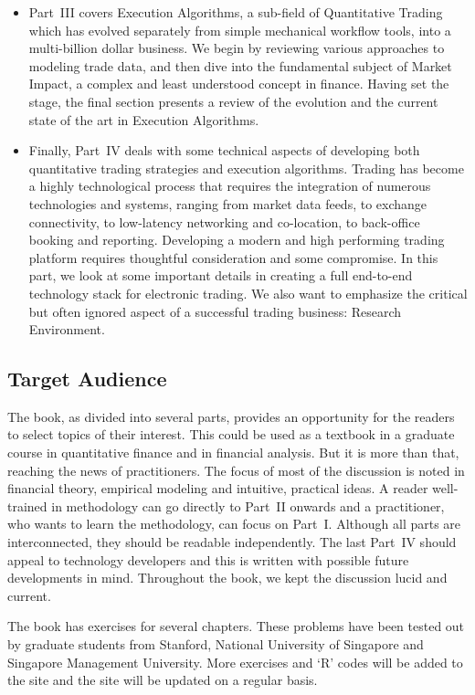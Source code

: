 \begin{itemize}
\item Part~III covers Execution Algorithms, a sub-field of Quantitative Trading which has evolved separately from simple mechanical workflow tools, into a multi-billion dollar business. We begin by reviewing various approaches to modeling trade data, and then dive into the fundamental subject of Market Impact, a complex and least understood concept in finance. Having set the stage, the final section presents a review of the evolution and the current state of the art in Execution Algorithms.

\item Finally, Part~IV deals with some technical aspects of developing both quantitative trading strategies and execution algorithms. Trading has become a highly technological process that requires the integration of numerous technologies and systems,  ranging from market data feeds, to exchange connectivity, to low-latency networking and co-location, to back-office booking and reporting. Developing a modern and high performing trading platform requires thoughtful consideration and some compromise. In this part, we look at some important details in creating a full end-to-end technology stack for electronic trading. We also want to emphasize the critical but often ignored aspect of a successful trading business: Research Environment.
\end{itemize} 


\subsection{Target Audience}

The book, as divided into several parts, provides an opportunity for the readers to select topics of their interest. This could be used as a textbook in a graduate course in quantitative finance and in financial analysis. But it is more than that, reaching the news of practitioners. The focus of most of the discussion is noted in financial theory, empirical modeling and intuitive, practical ideas. A reader well-trained in methodology can go directly to Part~II onwards and a practitioner, who wants to learn the methodology, can focus on Part~I. Although all parts are interconnected, they should be readable independently. The last Part~IV should appeal to technology developers and this is written with possible future developments in mind. Throughout the book, we kept the discussion lucid and current. 


The book has exercises for several chapters. These problems have been tested out by graduate students from Stanford, National University of Singapore and Singapore Management University. More exercises and `R' codes will be added to the site and the site will be updated on a regular basis. 